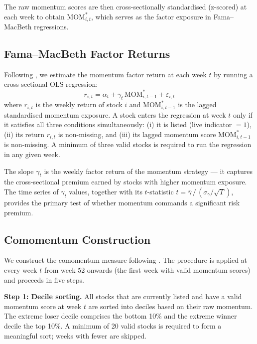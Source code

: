 \documentclass[10pt]{article}
\begin{document}
The raw momentum scores are then cross-sectionally standardised (z-scored) at each week to obtain $\text{MOM}^{*}_{i,t}$, which serves as the factor exposure in Fama--MacBeth regressions.


\subsection{Fama--MacBeth Factor Returns}

Following \citet{FamaMacBeth1973}, we estimate the momentum factor return at each week $t$ by running a cross-sectional OLS regression:
\begin{equation}
    r_{i,t} = \alpha_t + \gamma_t \, \text{MOM}^{*}_{i,t-1} + \varepsilon_{i,t}
\end{equation}
where $r_{i,t}$ is the weekly return of stock $i$ and $\text{MOM}^{*}_{i,t-1}$ is the lagged standardised momentum exposure. A stock enters the regression at week $t$ only if it satisfies all three conditions simultaneously: (i) it is listed (live indicator $= 1$), (ii) its return $r_{i,t}$ is non-missing, and (iii) its lagged momentum score $\text{MOM}^{*}_{i,t-1}$ is non-missing. A minimum of three valid stocks is required to run the regression in any given week.

The slope $\gamma_t$ is the weekly factor return of the momentum strategy --- it captures the cross-sectional premium earned by stocks with higher momentum exposure. The time series of $\gamma_t$ values, together with its $t$-statistic $t = \bar{\gamma}\, / \, (\sigma_{\gamma} / \sqrt{T})$, provides the primary test of whether momentum commands a significant risk premium.


\subsection{Comomentum Construction}

We construct the comomentum measure following \citet{LouPolk2021}. The procedure is applied at every week $t$ from week 52 onwards (the first week with valid momentum scores) and proceeds in five steps.

\textbf{Step 1: Decile sorting.} All stocks that are currently listed and have a valid momentum score at week $t$ are sorted into deciles based on their raw momentum. The extreme loser decile comprises the bottom 10\% and the extreme winner decile the top 10\%. A minimum of 20 valid stocks is required to form a meaningful sort; weeks with fewer are skipped.
\end{document}
